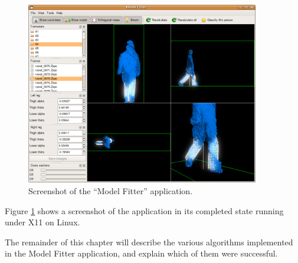 \begin{figure}[tb]
	\centering
	\includegraphics[height=8cm]{screenshot.png}
	\caption{Screenshot of the ``Model Fitter'' application.}
	\label{Screenshot}
\end{figure}

Figure \ref{Screenshot} shows a screenshot of the application in its completed state running under X11 on Linux.

\bigskip
The remainder of this chapter will describe the various algorithms implemented in the Model Fitter application,
and explain which of them were successful.